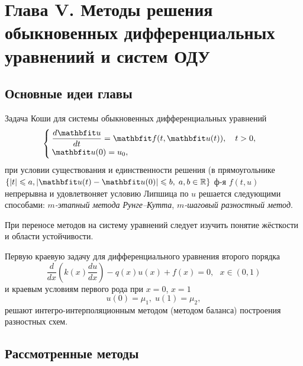\newpage
{}
\pagestyle{empty}
\vspace{0.5cm}

\section*{Глава V. Методы решения обыкновенных дифференциальных уравнениий и систем ОДУ}

\subsection{Основные идеи главы} 

Задача Коши для системы обыкновенных дифференциальных уравнений
\begin{equation}
%
    \label{Koshi_sys}
    \begin{cases}
        \dfrac{d\vfunc{u}}{dt} = \vfunc{f}(t, \vfunc{u}(t)), \quad t > 0, \\
        \vfunc{u}(0) = u_0,
    \end{cases}
\end{equation}
при условии существования и единственности решения (в прямоугольнике $\{|t| \leqslant a, | \vfunc{u}(t)-\vfunc{u}(0)| \leqslant b,\; a, b\in\mathbb{R}\}$ ф-я $f(t, u)$ непрерывна и удовлетвоняет условию Липшица по $u$ решается следующими способами: \textit{$m$-этапный метода Рунге--Кутта}, \textit{ $m$-шаговый разностный метод}.

При переносе методов на систему уравнений следует изучить понятие жёсткости и области устойчивости.
 
Первую краевую задачу для дифференциального уравнения второго порядка
\begin{equation}
    \label{eq:2-ord-eq}
    \dfrac{d}{dx}\left(k(x)\dfrac{du}{dx}\right) - q(x)u(x) + f(x) = 0, ~~~x\in(0,1)
\end{equation}
%
и краевым условиям первого рода при $x=0$, $x=1$
%
\begin{equation}
    \label{eq:2-ord-eq-bounds}
    u(0) = \mu_1,\;u(1) = \mu_2,
\end{equation}
%
решают интегро-интерполяционным методом (методом баланса) построения разностных схем.

\subsection{Рассмотренные методы}